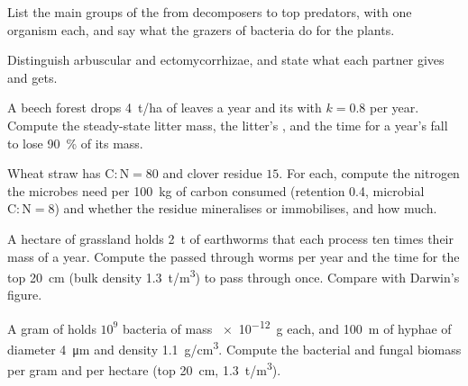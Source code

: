 \begin{exercise}[$\star$]\label{exo:b2:living-soil:3}
List the main groups of the  from decomposers to top
predators, with one organism each, and say what the grazers of
bacteria do for the plants.
\end{exercise}

\begin{exercise}[$\star$]\label{exo:b2:living-soil:4}
Distinguish arbuscular and ectomycorrhizae, and state what each
partner gives and gets.
\end{exercise}

\begin{exercise}[$\star\star$]\label{exo:b2:living-soil:5}
A beech forest drops \qty{4}{t/ha} of leaves a year and its  with $k = 0.8$ per year. Compute the steady-state litter
mass, the litter's , and the time for a year's fall
to lose \qty{90}{\%} of its mass.
\end{exercise}

\begin{exercise}[$\star\star$]\label{exo:b2:living-soil:6}
Wheat straw has $\mathrm{C:N} = 80$ and clover residue $15$. For
each, compute the nitrogen the microbes need per \qty{100}{kg} of
carbon consumed (retention 0.4, microbial $\mathrm{C:N} = 8$) and
whether the residue mineralises or immobilises, and how much.
\end{exercise}

\begin{exercise}[$\star\star$]\label{exo:b2:living-soil:7}
A hectare of grassland holds \qty{2}{t} of earthworms that each
process ten times their mass of  a year. Compute the 
passed through worms per year and the time for the top
\qty{20}{cm} (bulk density \qty{1.3}{t/m^3}) to pass through once.
Compare with Darwin's figure.
\end{exercise}

\begin{exercise}[$\star\star$]\label{exo:b2:living-soil:8}
A gram of  holds $10^{9}$ bacteria of mass \qty{e-12}{g} each,
and \qty{100}{m} of hyphae of diameter \qty{4}{\micro m} and density
\qty{1.1}{g/cm^3}. Compute the bacterial and fungal biomass per
gram and per hectare (top \qty{20}{cm}, \qty{1.3}{t/m^3}).
\end{exercise}

